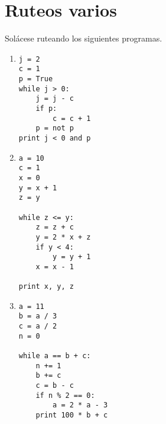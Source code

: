 \section{Ruteos varios}

Solácese ruteando los siguientes programas.

\begin{enumerate}
\item
\begin{lstlisting}
j = 2
c = 1
p = True
while j > 0:
    j = j - c
    if p:
        c = c + 1
    p = not p
print j < 0 and p
\end{lstlisting}

\item
\begin{lstlisting}
a = 10
c = 1
x = 0
y = x + 1
z = y

while z <= y:
    z = z + c
    y = 2 * x + z
    if y < 4:
        y = y + 1
    x = x - 1

print x, y, z
\end{lstlisting}

\item
\begin{lstlisting}
a = 11
b = a / 3
c = a / 2
n = 0

while a == b + c:
    n += 1
    b += c
    c = b - c
    if n % 2 == 0:
        a = 2 * a - 3
    print 100 * b + c
\end{lstlisting}

\end{enumerate}
